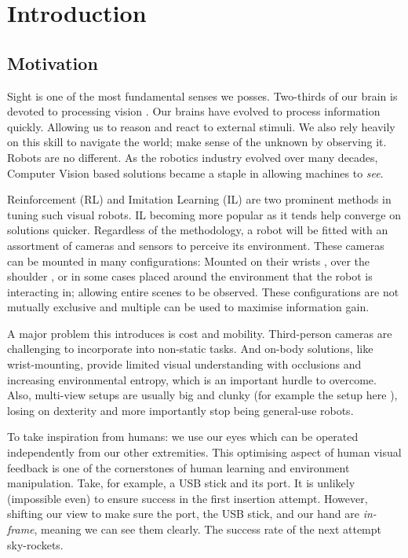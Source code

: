 \chapter{Introduction}
\section{Motivation}
    
  Sight is one of the most fundamental senses we posses. Two-thirds of our brain is devoted to processing vision \cite{fixot1957ophthalmology}. Our brains have evolved to process information quickly. Allowing us to reason and react to external stimuli. We also rely heavily on this skill to navigate the world; make sense of the unknown by observing it. Robots are no different. As the robotics industry evolved over many decades, Computer Vision based solutions became a staple in allowing machines to \emph{see}.

  Reinforcement (RL) \cite{silver2015} and Imitation Learning (IL) \cite{attia2018globaloverviewimitationlearning, ARGALL2009469} are two prominent methods in tuning such visual robots. IL becoming more popular as it tends help converge on solutions quicker. Regardless of the methodology, a robot will be fitted with an assortment of cameras and sensors to perceive its environment. These cameras can be mounted in many configurations: Mounted on their wrists \cite{chi2024UMIinthewild,openXEmbodimentRoboticLearning2024}, over the shoulder \cite{wang2024observeactasynchronousactive}, or in some cases placed around the environment \cite{exploringActiveVision2024chuang} that the robot is interacting in; allowing entire scenes to be observed. These configurations are not mutually exclusive and multiple can be used to maximise information gain. 
  
  A major problem this introduces is cost and mobility. Third-person cameras are challenging to incorporate into non-static tasks. And on-body solutions, like wrist-mounting, provide limited visual understanding with occlusions and increasing environmental entropy, which is an important hurdle to overcome. Also, multi-view setups are usually big and clunky (for example the setup here \cite{zhao2024alohaunleashed}), losing on dexterity and more importantly stop being general-use robots.

  To take inspiration from humans: we use our eyes which can be operated independently from our other extremities. This optimising aspect of human visual feedback \cite{findlay2003active,maiello2021humans,goodman2018using} is one of the cornerstones of human learning and environment manipulation. Take, for example, a USB stick and its port. It is unlikely (impossible even) to ensure success in the first insertion attempt. However, shifting our view to make sure the port, the USB stick, and our hand are \emph{in-frame}, meaning we can see them clearly. The success rate of the next attempt sky-rockets.
  
